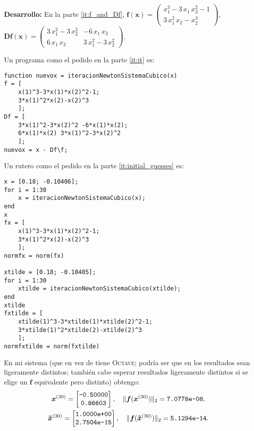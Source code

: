 \textbf{Desarrollo:} En la parte \ref{it:f_and_Df}, $\boldsymbol{f}(\boldsymbol{x}) = \begin{pmatrix} x_1^3 - 3 \, x_1 \, x_2^2 - 1\\ 3 \, x_1^2 \, x_2 - x_2^3\end{pmatrix}$, $\boldsymbol{D} \boldsymbol{f}(\boldsymbol{x}) = \begin{pmatrix} 3\, x_1^2 - 3\, x_2^2 & -6 \, x_1 \, x_2 \\ 6 \, x_1 \, x_2 & 3\, x_1^2 - 3 \, x_2^2 \end{pmatrix}$.

Un programa como el pedido en la parte \ref{it:it} es:
\begin{lstlisting}
function nuevox = iteracionNewtonSistemaCubico(x)
f = [
    x(1)^3-3*x(1)*x(2)^2-1;
    3*x(1)^2*x(2)-x(2)^3
    ];
Df = [
    3*x(1)^2-3*x(2)^2 -6*x(1)*x(2);
    6*x(1)*x(2) 3*x(1)^2-3*x(2)^2
    ];
nuevox = x - Df\f;
\end{lstlisting}

Un rutero como el pedido en la parte \ref{it:initial_guesses} es:
\begin{lstlisting}
x = [0.18; -0.10406];
for i = 1:30
    x = iteracionNewtonSistemaCubico(x);
end
x
fx = [
    x(1)^3-3*x(1)*x(2)^2-1;
    3*x(1)^2*x(2)-x(2)^3
    ];
normfx = norm(fx)

xtilde = [0.18; -0.10405];
for i = 1:30
    xtilde = iteracionNewtonSistemaCubico(xtilde);
end
xtilde
fxtilde = [
    xtilde(1)^3-3*xtilde(1)*xtilde(2)^2-1;
    3*xtilde(1)^2*xtilde(2)-xtilde(2)^3
    ];
normfxtilde = norm(fxtilde)
\end{lstlisting}

En mi sistema (que en vez de \matlab tiene \textsc{Octave}; podr\'ia ser que en \matlab los resultados sean ligeramente distintos; tambi\'en cabe esperar resultados ligeramente distintos si se elige un $\boldsymbol{f}$ equivalente pero distinto) obtengo:
\begin{gather*}
\boldsymbol{x}^{(30)} = \begin{bmatrix} \text{\texttt{-0.50000}} \\ \text{\texttt{0.86603}} \end{bmatrix}, \quad \|\boldsymbol{f}(\boldsymbol{x}^{(30)})\|_2 = \text{\texttt{7.0778e-08}},\\
\boldsymbol{\tilde x}^{(30)} = \begin{bmatrix} \text{\texttt{1.0000e+00}} \\ \text{\texttt{2.7504e-15}} \end{bmatrix}, \quad \|\boldsymbol{f}(\boldsymbol{\tilde x}^{(30)})\|_2 = \text{\texttt{5.1294e-14}}.
\end{gather*}

